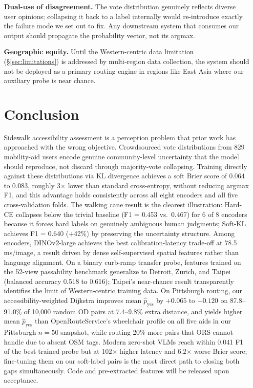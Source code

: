\documentclass[conference]{IEEEtran}
\begin{document}
\textbf{Dual-use of disagreement.} The vote distribution genuinely reflects diverse user opinions; collapsing it back to a label internally would re-introduce exactly the failure mode we set out to fix. Any downstream system that consumes our output should propagate the probability vector, not its argmax.

\textbf{Geographic equity.} Until the Western-centric data limitation (\S\ref{sec:limitations}) is addressed by multi-region data collection, the system should not be deployed as a primary routing engine in regions like East Asia where our auxiliary probe is near chance.

\FloatBarrier
\section{Conclusion}
\label{sec:conclusion}

Sidewalk accessibility assessment is a perception problem that prior work has approached with the wrong objective. Crowdsourced vote distributions from 829 mobility-aid users encode genuine community-level uncertainty that the model should reproduce, not discard through majority-vote collapsing. Training directly against these distributions via KL divergence achieves a soft Brier score of 0.064 to 0.083, roughly 3$\times$ lower than standard cross-entropy, without reducing argmax F1, and this advantage holds consistently across all eight encoders and all five cross-validation folds. The walking cane result is the clearest illustration: Hard-CE collapses below the trivial baseline (F1 = 0.453 vs.\ 0.467) for 6 of 8 encoders because it forces hard labels on genuinely ambiguous human judgments; Soft-KL achieves F1 = 0.640 (+42\%) by preserving the uncertainty structure. Among encoders, DINOv2-large achieves the best calibration-latency trade-off at 78.5\,ms/image, a result driven by dense self-supervised spatial features rather than language alignment. On a binary curb-ramp transfer probe, features trained on the 52-view passability benchmark generalize to Detroit, Zurich, and Taipei (balanced accuracy 0.518 to 0.616); Taipei's near-chance result transparently identifies the limit of Western-centric training data. On Pittsburgh routing, our accessibility-weighted Dijkstra improves mean $\hat{p}_\mathrm{yes}$ by $+0.065$ to $+0.120$ on 87.8--91.0\% of 10,000 random OD pairs at 7.4--9.8\% extra distance, and yields higher mean $\hat{p}_\mathrm{yes}$ than OpenRouteService's wheelchair profile on all five aids in our Pittsburgh $n=50$ snapshot, while routing 20\% more pairs that ORS cannot handle due to absent OSM tags. Modern zero-shot VLMs reach within 0.041 F1 of the best trained probe but at 102$\times$ higher latency and 6.2$\times$ worse Brier score; fine-tuning them on our soft-label pairs is the most direct path to closing both gaps simultaneously. Code and pre-extracted features will be released upon acceptance.



\end{document}
